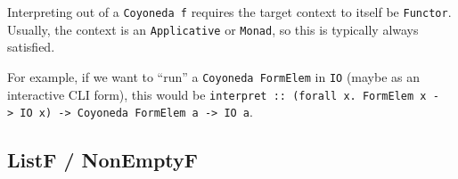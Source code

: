 \documentclass[]{article}
\begin{document}
\begin{itemize}
  Interpreting out of a \texttt{Coyoneda\ f} requires the target context to
  itself be \texttt{Functor}. Usually, the context is an \texttt{Applicative} or
  \texttt{Monad}, so this is typically always satisfied.

  For example, if we want to ``run'' a \texttt{Coyoneda\ FormElem} in
  \texttt{IO} (maybe as an interactive CLI form), this would be
  \texttt{interpret\ ::\ (forall\ x.\ FormElem\ x\ -\textgreater{}\ IO\ x)\ -\textgreater{}\ Coyoneda\ FormElem\ a\ -\textgreater{}\ IO\ a}.
\end{itemize}

\subsection{ListF / NonEmptyF}\label{listf-nonemptyf}
\end{document}
